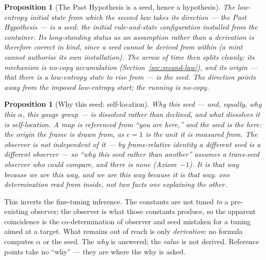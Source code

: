 \documentclass[11pt,a4paper]{article}
\newtheorem{proposition}[definition]{Proposition}
\theoremstyle{remark}\newtheorem{remark}[definition]{Remark}
\begin{document}
\begin{proposition}[The Past Hypothesis is a seed, hence a hypothesis]\label{prop:past-hyp}
The low-entropy initial state from which the second law takes its direction ---
the Past Hypothesis --- is a seed: the initial rule-and-state configuration
installed from the container. Its long-standing status as an assumption rather
than a derivation is therefore correct in kind, since a seed cannot be derived
from within (a mint cannot authorise its own installation). The arrow of time
then splits cleanly: its \emph{mechanism} is no-copy accumulation
(Section~\ref{sec:second-law}), and its \emph{origin} --- that there is a
low-entropy state to rise from --- is the seed. The direction points away from
the imposed low-entropy start; the running is no-copy.
\end{proposition}

\begin{proposition}[Why this seed: self-location]\label{prop:self-location}
Why \emph{this} seed --- and, equally, why this $\alpha$, this gauge group --- is
dissolved rather than declined, and what dissolves it is self-location. A map is referenced from
``you are here,'' and the seed is the here: the origin the frame is drawn from,
as $c=1$ is the unit it is measured from. The observer is not independent of it
--- by frame-relative identity a different seed is a different observer --- so
``why this seed rather than another'' assumes a trans-seed observer who could
compare, and there is none (Axiom~$-1$). It is that way because we are this way,
and we are this way because it is that way: one determination read from inside,
not two facts one explaining the other.
\end{proposition}
This inverts the fine-tuning inference. The constants are not tuned \emph{to} a
pre-existing observer; the observer is what those constants produce, so the
apparent coincidence is the co-determination of observer and seed mistaken for a
tuning aimed at a target. What remains out of reach is only \emph{derivation}: no formula
computes $\alpha$ or the seed. The \emph{why} is answered; the \emph{value} is
not derived. Reference points take no ``why'' --- they are where the why is
asked.
\end{document}
